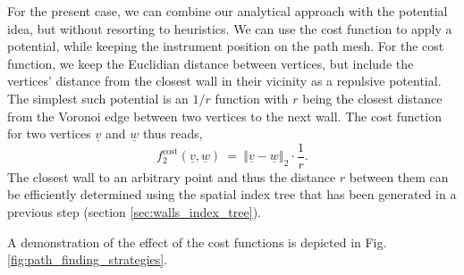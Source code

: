 For the present case, we can combine our analytical approach with the potential idea, but without 
resorting to heuristics. We can use the cost function to apply a potential, while keeping the
instrument position on the path mesh.
For the cost function, we keep the Euclidian distance between vertices, but include the vertices' 
distance from the closest wall in their vicinity as a repulsive potential. 
The simplest such potential is an $1/r$ function with $r$ being the closest distance from the 
Voronoi edge between two vertices to the next wall.
The cost function for two vertices $\underline{v}$ and $\underline{w}$ thus reads,
\begin{equation}
	f^{\mathrm{cost}}_2\left(\underline{v}, \underline{w} \right) \ = \ 
	\left\Vert \underline{v} - \underline{w} \right\Vert_2 \cdot \frac{1}{r}.
\end{equation}
The closest wall to an arbitrary point and thus the distance $r$ between them can be efficiently
determined using the spatial index tree that has been generated in a previous step
(section \ref{sec:walls_index_tree}).

A demonstration of the effect of the cost functions is depicted in Fig. \ref{fig:path_finding_strategies}.


